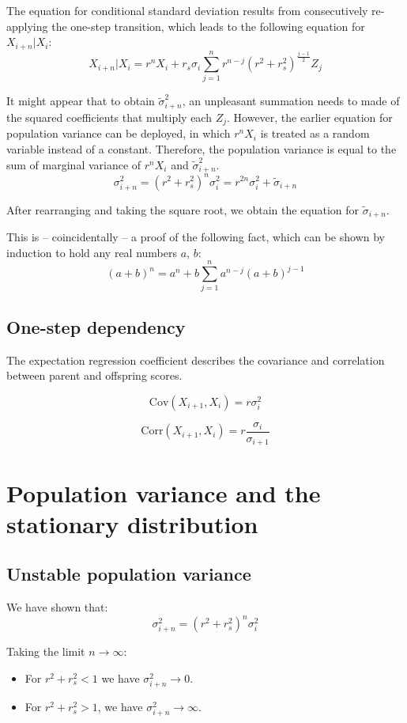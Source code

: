 \documentclass[a4paper,11pt]{article}
\begin{document}
The equation for conditional standard deviation results from consecutively re-applying the one-step transition, which leads to the following equation for $X_{i+n}|X_i$:
$$X_{i+n}|X_i = r^nX_i + r_s\sigma_i \sum_{j=1}^{n}r^{n-j}(r^2+r_s^2)^{\frac{j-1}{2}}Z_j$$

It might appear that to obtain $\tilde{\sigma}_{i+n}^2$, an unpleasant summation needs to made of the squared coefficients that multiply each $Z_j$. However, the earlier equation for population variance can be deployed, in which $r^nX_i$ is treated as a random variable instead of a constant. Therefore, the population variance is equal to the sum of marginal variance of $r^nX_i$ and $\tilde{\sigma}_{i+n}^2$.
$$\sigma_{i+n}^2 =  (r^2+r_s^2)^n  \sigma_{i}^2 =  r^{2n}\sigma_i^2 + \tilde{\sigma}_{i+n}$$

After rearranging and taking the square root, we obtain the equation for $\tilde{\sigma}_{i+n}$.

This is -- coincidentally -- a proof of the following fact, which can be shown by induction to hold any real numbers $a$,  $b$:
$$(a+b)^n = a^n + b \sum_{j=1}^{n}a^{n-j}(a+b)^{j-1}$$


\subsection{One-step dependency}
The expectation regression coefficient describes the covariance and correlation between parent and offspring scores. 

$$\mathrm{Cov}(X_{i+1}, X_i) = r \sigma_i^2$$

$$\mathrm{Corr}(X_{i+1}, X_i) = r \frac{\sigma_i}{\sigma_{i+1}}$$



\section{Population variance and the stationary distribution}

\subsection{Unstable population variance}
We have shown that:
$$\sigma_{i+n}^2 = (r^2+r_s^2)^n  \sigma_{i}^2$$

Taking the limit $n \rightarrow \infty$: 
\begin{itemize}
\item For $r^2+r_s^2 < 1$ we have $\sigma_{i+n}^2 \rightarrow 0$.
\item For  $r^2+r_s^2 > 1$, we have $\sigma_{i+n}^2 \rightarrow \infty$. 
\end{itemize}
\end{document}
